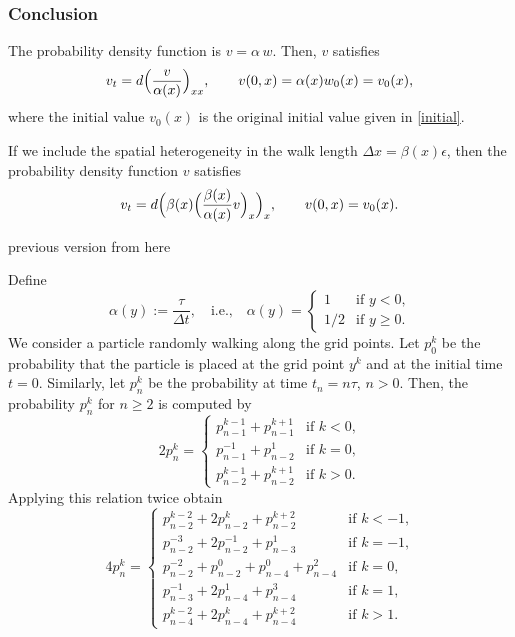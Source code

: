 \documentclass[11pt]{amsart}
\def\red{\color{red}}
\begin{document}
\subsubsection{Conclusion}

The probability density function is $v=\alpha\, w$. Then, $v$ satisfies
$$
v_t=d\Big({v\over\alpha(x)}\Big)_{xx},\qquad
v(0,x)={\alpha(x)w_0(x)}=v_0(x),
$$
where the initial value $v_0(x)$ is the original initial value given in
\eqref{initial}.

If we include the spatial heterogeneity in the walk length
$\Delta x=\beta(x)\epsilon$, then the probability density function $v$
satisfies
$$
v_t=d\Big(\beta(x)\Big({\beta(x)\over\alpha(x)}v\Big)_x\Big)_x,\qquad
v(0,x)=v_0(x).
$$

{\red previous version from here}

Define
\begin{equation}\label{alpha_old}
\alpha(y):=\frac{\tau}{\Delta t},\quad\text{i.e.,}\quad
\alpha(y)=
\begin{cases}
1 & \text{if $y<0$,}\\
1/2 & \text{if $y\geq 0$.}
\end{cases}
\end{equation}
We consider a particle randomly walking along the grid points. Let $p_0^k$ be the probability that the particle is placed at the grid point $y^k$ and at the initial time $t=0$. Similarly, let $p_n^k$ be the probability at time $t_n=n\tau$, $n>0$. Then, the probability $p^k_n$ for $n\ge2$ is computed by
\begin{equation}\label{interior2}
2p_n^k=
\begin{cases}
p_{n-1}^{k-1}+p_{n-1}^{k+1} & \text{if $k<0$,}\\
p_{n-1}^{-1}+p_{n-2}^{1} & \text{if $k=0$,}\\
p_{n-2}^{k-1}+p_{n-2}^{k+1} & \text{if $k>0$.}
\end{cases}
\end{equation}
Applying this relation twice obtain
\[
4p_n^k=
\begin{cases}
p_{n-2}^{k-2}+2p_{n-2}^{k}+p_{n-2}^{k+2} & \text{if $k<-1$,}\\
p_{n-2}^{-3}+2p_{n-2}^{-1}+\boxed{p_{n-3}^1} & \text{if $k=-1$,}\\
p_{n-2}^{-2}+p_{n-2}^{0}+p_{n-4}^{0}+p_{n-4}^{2} & \text{if $k=0$,}\\
\boxed{p_{n-3}^{-1}}+2p_{n-4}^{1}+p_{n-4}^3 & \text{if $k=1$,}\\
p_{n-4}^{k-2}+2p_{n-4}^{k}+p_{n-4}^{k+2} & \text{if $k>1$.}
\end{cases}
\]
\end{document}
